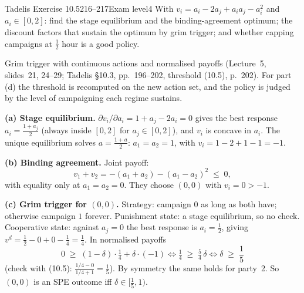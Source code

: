 \begin{exsol}{Tadelis Exercise 10.5}{216--217}{Exam level}{4}
\asked With $v_i = a_i - 2a_j + a_ia_j - a_i^2$ and $a_i \in [0,2]$: find the stage equilibrium and the
binding-agreement optimum; the discount factors that sustain the optimum by grim trigger; and whether capping
campaigns at $\frac12$ hour is a good policy.

\method Grim trigger with continuous actions and normalised payoffs (Lecture~5, slides~21, 24--29; Tadelis
\S10.3, pp.~196--202, threshold (10.5), p.~202). For part (d) the threshold is recomputed on the new action set,
and the policy is judged by the level of campaigning each regime sustains.

\solution
\textbf{(a) Stage equilibrium.} $\partial v_i/\partial a_i = 1 + a_j - 2a_i = 0$ gives the best response
$a_i = \frac{1 + a_j}{2}$ (always inside $[0,2]$ for $a_j \in [0,2]$), and $v_i$ is concave in $a_i$. The unique
equilibrium solves $a = \frac{1 + a}{2}$: $a_1 = a_2 = 1$, with $v_i = 1 - 2 + 1 - 1 = -1$.

\textbf{(b) Binding agreement.} Joint payoff:
\[
  v_1 + v_2 = -(a_1 + a_2) - (a_1 - a_2)^2 \;\le\; 0,
\]
with equality only at $a_1 = a_2 = 0$. They choose $(0,0)$ with $v_i = 0 > -1$.

\textbf{(c) Grim trigger for $(0,0)$.} Strategy: campaign $0$ as long as both have; otherwise campaign $1$
forever. Punishment state: a stage equilibrium, so no check. Cooperative state: against $a_j = 0$ the best
response is $a_i = \frac12$, giving $v^d = \frac12 - 0 + 0 - \frac14 = \frac14$. In normalised payoffs
\[
  0 \;\ge\; (1-\delta)\cdot\tfrac14 + \delta\cdot(-1)
  \iff \tfrac14 \;\ge\; \tfrac54\,\delta \iff \delta \;\ge\; \frac{1}{5}
\]
(check with (10.5): $\frac{1/4 - 0}{1/4 + 1} = \frac15$). By symmetry the same holds for party~2. So $(0,0)$ is an SPE
outcome iff $\delta \in [\frac15, 1)$.


\end{exsol}
